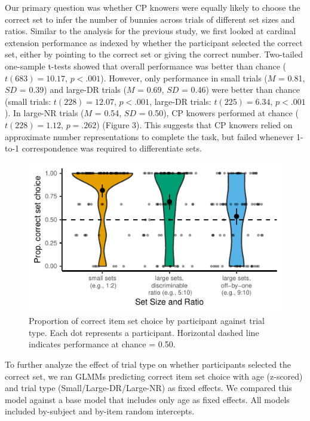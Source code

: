\documentclass[10pt, letterpaper]{article}
\newenvironment{CodeChunk}{}{}
\begin{document}
Our primary question was whether CP knowers were equally likely to
choose the correct set to infer the number of bunnies across trials of
different set sizes and ratios. Similar to the analysis for the previous
study, we first looked at cardinal extension performance as indexed by
whether the participant selected the correct set, either by pointing to
the correct set or giving the correct number. Two-tailed one-sample
t-tests showed that overall performance was better than chance
(\(t(683) = 10.17\), \(p < .001\)). However, only performance in small
trials (\(M\) = 0.81, \(SD\) = 0.39) and large-DR trials (\(M\) = 0.69,
\(SD\) = 0.46) were better than chance (small trials:
\(t(228) = 12.07\), \(p < .001\), large-DR trials: \(t(225) = 6.34\),
\(p < .001\)). In large-NR trials (\(M\) = 0.54, \(SD\) = 0.50), CP
knowers performed at chance (\(t(228) = 1.12\), \(p = .262\)) (Figure
3). This suggests that CP knowers relied on approximate number
representations to complete the task, but failed whenever 1-to-1
correspondence was required to differentiate sets.

\begin{CodeChunk}
\begin{figure}[h]

{\centering \includegraphics{figs/study2-figure-1} 

}

\caption[Proportion of correct item set choice by participant against trial type]{Proportion of correct item set choice by participant against trial type. Each dot represents a participant. Horizontal dashed line indicates performance at chance = 0.50.}\label{fig:study2-figure}
\end{figure}
\end{CodeChunk}

To further analyze the effect of trial type on whether participants
selected the correct set, we ran GLMMs predicting correct item set
choice with age (z-scored) and trial type (Small/Large-DR/Large-NR) as
fixed effects. We compared this model against a base model that includes
only age as fixed effects. All models included by-subject and by-item
random intercepts.
\end{document}
